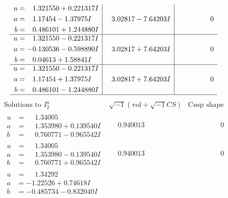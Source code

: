\documentclass[1p]{elsarticle_modified}
\theoremstyle{definition}
\newcommand{\I}{\sqrt{-1}}
\begin{document}
$$\begin{array}{c|c|c}
\begin{aligned}
u &= \phantom{-}1.321550 + 0.221317 I \\
a &= \phantom{-}1.17454 - 1.37975 I \\
b &= \phantom{-}0.486101 + 1.244880 I\end{aligned}
 & \phantom{-}3.02817 - 7.64203 I & \phantom{-0.000000 } 0 \\ \hline\begin{aligned}
u &= \phantom{-}1.321550 - 0.221317 I \\
a &= -0.130536 - 0.598890 I \\
b &= \phantom{-}0.04613 + 1.58841 I\end{aligned}
 & \phantom{-}3.02817 + 7.64203 I & \phantom{-0.000000 } 0 \\ \hline\begin{aligned}
u &= \phantom{-}1.321550 - 0.221317 I \\
a &= \phantom{-}1.17454 + 1.37975 I \\
b &= \phantom{-}0.486101 - 1.244880 I\end{aligned}
 & \phantom{-}3.02817 + 7.64203 I & \phantom{-0.000000 } 0\\
 \hline 
 \end{array}$$\newpage$$\begin{array}{c|c|c}  
\text{Solutions to }I^u_{2}& \I (\text{vol} + \sqrt{-1}CS) & \text{Cusp shape}\\
 \hline 
\begin{aligned}
u &= \phantom{-}1.34005\phantom{ +0.000000I} \\
a &= \phantom{-}1.353980 + 0.139540 I \\
b &= \phantom{-}0.760771 - 0.965542 I\end{aligned}
 & \phantom{-}0.940013\phantom{ +0.000000I} & \phantom{-0.000000 } 0 \\ \hline\begin{aligned}
u &= \phantom{-}1.34005\phantom{ +0.000000I} \\
a &= \phantom{-}1.353980 - 0.139540 I \\
b &= \phantom{-}0.760771 + 0.965542 I\end{aligned}
 & \phantom{-}0.940013\phantom{ +0.000000I} & \phantom{-0.000000 } 0 \\ \hline\begin{aligned}
u &= \phantom{-}1.34292\phantom{ +0.000000I} \\
a &= -1.22526 + 0.74618 I \\
b &= -0.485734 - 0.832040 I\end{aligned}

\end{array}$$
\end{document}
